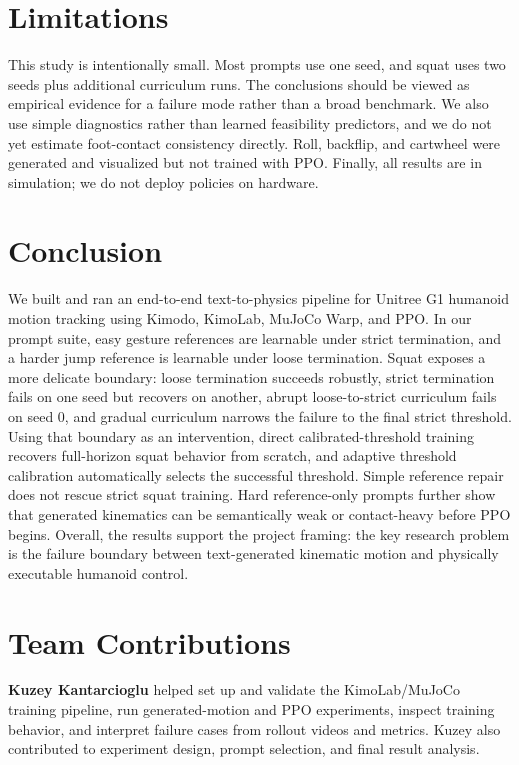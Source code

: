 \documentclass[10pt]{article}
\begin{document}
\section{Limitations}

This study is intentionally small. Most prompts use one seed, and squat uses two seeds plus additional curriculum runs. The conclusions should be viewed as empirical evidence for a failure mode rather than a broad benchmark. We also use simple diagnostics rather than learned feasibility predictors, and we do not yet estimate foot-contact consistency directly. Roll, backflip, and cartwheel were generated and visualized but not trained with PPO. Finally, all results are in simulation; we do not deploy policies on hardware.

\section{Conclusion}

We built and ran an end-to-end text-to-physics pipeline for Unitree G1 humanoid motion tracking using Kimodo, KimoLab, MuJoCo Warp, and PPO. In our prompt suite, easy gesture references are learnable under strict termination, and a harder jump reference is learnable under loose termination. Squat exposes a more delicate boundary: loose termination succeeds robustly, strict termination fails on one seed but recovers on another, abrupt loose-to-strict curriculum fails on seed 0, and gradual curriculum narrows the failure to the final strict threshold. Using that boundary as an intervention, direct calibrated-threshold training recovers full-horizon squat behavior from scratch, and adaptive threshold calibration automatically selects the successful threshold. Simple reference repair does not rescue strict squat training. Hard reference-only prompts further show that generated kinematics can be semantically weak or contact-heavy before PPO begins. Overall, the results support the project framing: the key research problem is the failure boundary between text-generated kinematic motion and physically executable humanoid control.

\section*{Team Contributions}

\textbf{Kuzey Kantarcioglu} helped set up and validate the KimoLab/MuJoCo training pipeline, run generated-motion and PPO experiments, inspect training behavior, and interpret failure cases from rollout videos and metrics. Kuzey also contributed to experiment design, prompt selection, and final result analysis.
\end{document}
